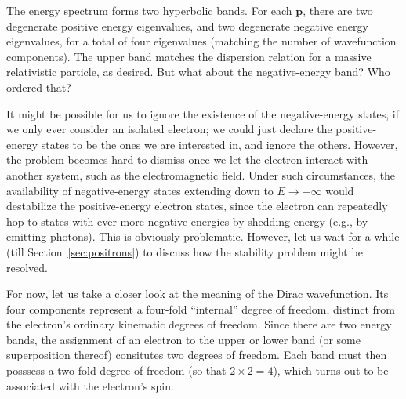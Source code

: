 \documentclass[prx,12pt]{revtex4-2}
\begin{document}
\noindent
The energy spectrum forms two hyperbolic bands.  For each
$\mathbf{p}$, there are two degenerate positive energy eigenvalues,
and two degenerate negative energy eigenvalues, for a total of four
eigenvalues (matching the number of wavefunction components).  The
upper band matches the dispersion relation for a massive relativistic
particle, as desired.  But what about the negative-energy band?  Who
ordered that?

It might be possible for us to ignore the existence of the
negative-energy states, if we only ever consider an isolated electron;
we could just declare the positive-energy states to be the ones we are
interested in, and ignore the others.  However, the problem becomes
hard to dismiss once we let the electron interact with another system,
such as the electromagnetic field.  Under such circumstances, the
availability of negative-energy states extending down to $E\rightarrow
-\infty$ would destabilize the positive-energy electron states, since
the electron can repeatedly hop to states with ever more negative
energies by shedding energy (e.g., by emitting photons).  This is
obviously problematic.  However, let us wait for a while (till
Section~\ref{sec:positrons}) to discuss how the stability problem
might be resolved.

For now, let us take a closer look at the meaning of the Dirac
wavefunction.  Its four components represent a four-fold ``internal''
degree of freedom, distinct from the electron's ordinary kinematic
degrees of freedom.  Since there are two energy bands, the assignment
of an electron to the upper or lower band (or some superposition
thereof) consitutes two degrees of freedom.  Each band must then
posssess a two-fold degree of freedom (so that $2\times 2 = 4$), which
turns out to be associated with the electron's spin.
\end{document}
